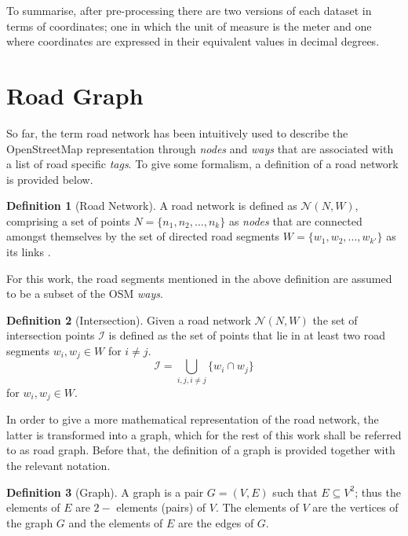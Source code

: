 \documentclass[12pt]{article}
\theoremstyle{definition}
\newtheorem{definition}{Definition}[section]
\begin{document}
To summarise, after pre-processing there are two versions of each dataset in terms of coordinates; one in which the unit of measure is the meter and one where coordinates are expressed in their equivalent values in decimal degrees. 

\section{Road Graph}\label{RoadGraph}
So far, the term road network has been intuitively used to describe the OpenStreetMap representation through \textit{nodes} and \textit{ways} that are associated with a list of road specific \textit{tags}. To give some formalism, a definition of a road network is provided below.

\begin{definition}[Road Network]
    A road network is defined as $\mathcal{N}(N, W)$, comprising a set of points $N=\{n_1, n_2,...,n_k\}$ as \textit{nodes} that are connected amongst themselves by the set of directed road segments $W=\{w_1, w_2,...,w_{k'}\}$ as its links \cite{roadNetworkDef}.
\end{definition}

For this work, the road segments mentioned in the above definition are assumed to be a subset of the OSM \textit{ways}.

\begin{definition}[Intersection]
    Given a road network $\mathcal{N}(N, W)$ the set of intersection points $\mathcal{I}$ is defined as the set of points that lie in at least two road segments $w_i, w_j\in W$ for $i\neq j$. 
    \begin{equation*}
        \mathcal{I} = \bigcup_{i,j,i\neq j} \{w_i\cap w_j\}
    \end{equation*} for $w_i, w_j\in W$. 
\end{definition} 

In order to give a more mathematical representation of the road network, the latter is transformed into a graph, which for the rest of this work shall be referred to as road graph. Before that, the definition of a graph is provided together with the relevant notation.

\begin{definition}[Graph]
    A graph is a pair $G=(V,E)$ such that $E\subseteq V^2$; thus the elements of $E$ are $2-$ elements (pairs) of $V$. The elements of $V$ are the vertices of the graph $G$ and the elements of $E$ are the edges of $G$. \cite{GraphDef}
\end{definition}
\end{document}
